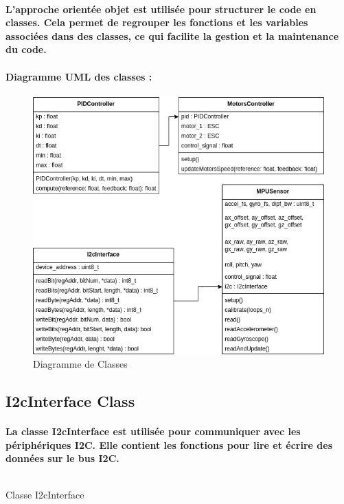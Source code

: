\paragraph{L'approche orientée objet est utilisée pour structurer le code en classes. Cela permet de regrouper les fonctions et les variables associées dans des classes, ce qui facilite la gestion et la maintenance du code.}

\paragraph{Diagramme UML des classes :}
\paragraph*{}
\begin{figure}[!htpb]
	\centering
	\includegraphics[width=\textwidth]{Figures/uml-oop.png}
	\caption{Diagramme de Classes}
	\label{fig:uml-diagram}
\end{figure}

\subsection{I2cInterface Class}
\paragraph{La classe I2cInterface est utilisée pour communiquer avec les périphériques I2C. Elle contient les fonctions pour lire et écrire des données sur le bus I2C.}
\newpage
\begin{listing}[!htpb]
	\inputminted{cpp}{Code/I2cInterface.h}
	\caption{Classe I2cInterface}
	\label{listing:i2c-interface}
\end{listing}

